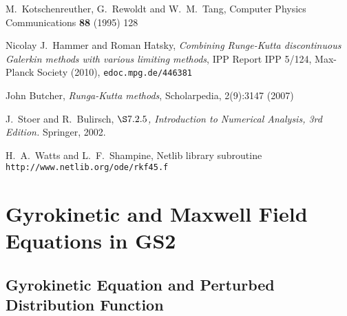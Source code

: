\documentclass[10pt,a4paper]{article}
\begin{document}
\begin{thebibliography}{99}

M.~Kotschenreuther, G.~Rewoldt and W.~M.~Tang, Computer Physics
  Communications \textbf{88} (1995) 128

Nicolay J.~Hammer and Roman Hatsky, \textit{Combining Runge-Kutta
  discontinuous Galerkin methods with various limiting methods}, IPP Report
IPP 5/124, Max-Planck Society (2010), \texttt{edoc.mpg.de/446381}

John Butcher, \textit{Runga-Kutta methods}, Scholarpedia, 2(9):3147 (2007)

J.~Stoer and R.~Bulirsch, \textit{$\S 7.2.5$, Introduction to Numerical Analysis, 3rd
  Edition.} Springer, 2002.

H.~A.~Watts and L.~F.~Shampine, Netlib library subroutine
\texttt{http://www.netlib.org/ode/rkf45.f}




\end{thebibliography}

\newpage
\appendix

\section{Gyrokinetic and Maxwell Field Equations in GS2}

\subsection{\label{GKE} Gyrokinetic Equation and Perturbed Distribution
  Function}
\end{document}

